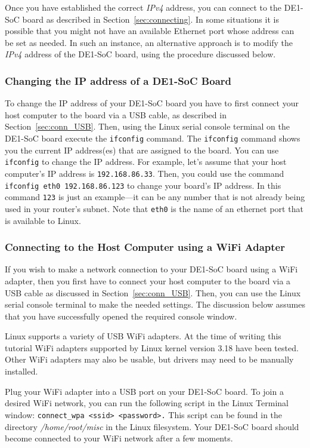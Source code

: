 \documentclass[11pt, twoside, pdftex]{article}
\begin{document}
Once you have established the correct {\it IPv4} address, you can connect to the DE1-SoC
board as described in Section~\ref{sec:connecting}. In some situations it is possible that
you might not have an available Ethernet port whose address can be set as needed.
In such an instance, an alternative approach is to modify the 
{\it IPv4} address of the DE1-SoC board, using the procedure discussed below.

\subsubsection*{Changing the IP address of a DE1-SoC Board}

To change the IP address of your DE1-SoC board you have to first connect your host computer
to the board via a USB cable, as described in Section~\ref{sec:conn_USB}. Then, using the 
Linux serial console terminal on the DE1-SoC board execute the \texttt{ifconfig} 
command. The \texttt{ifconfig} command shows you the current IP address(es) that are
assigned to the board. You can use \texttt{ifconfig} to change the IP address. For example, 
let's assume that your host computer's IP address is \texttt{192.168.86.33}. Then, you could 
use the command \texttt{ifconfig eth0 192.168.86.123} to change your board's IP address.
In this command \texttt{123} is just an example---it can be any number that is not
already being used in your router's subnet. Note that \texttt{eth0} is the name of an ethernet
port that is available to Linux.

\subsubsection{Connecting to the Host Computer using a WiFi Adapter}
\label{sec:WiFi}
If you wish to make a network connection to your DE1-SoC board using a WiFi adapter, then 
you first have to connect your host computer to the board via a USB cable
as discussed in Section~\ref{sec:conn_USB}. Then, you can use the Linux serial console
terminal to make the needed settings. The discussion below assumes that you have 
successfully opened the required console window. 

Linux supports a variety of USB WiFi adapters. At the time of writing this
tutorial WiFi adapters supported by Linux kernel version 3.18 have been tested. Other WiFi
adapters may also be usable, but drivers may need to be manually installed.

Plug your WiFi adapter into a USB port on your DE1-SoC board. To join a desired WiFi network, 
you can run the following script in the Linux Terminal 
window: \texttt{connect\_wpa <ssid> <password>.} This script can 
be found in the directory {\it /home/root/misc} in the Linux filesystem. Your DE1-SoC 
board should become connected to your WiFi network after a few moments.
\end{document}
